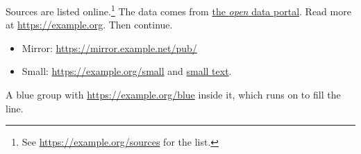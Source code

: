 \documentclass{article}
\begin{document}
Sources are listed online.\footnote{See \url{https://example.org/sources} for the list.} The
data comes from \href{https://data.example.org}{the \emph{open} data portal}. Read more at
\url{https://example.org}. Then continue.

\begin{itemize}
  \item Mirror: \url{https://mirror.example.net/pub/}
  \item {\small Small: \url{https://example.org/small} and \href{https://example.org/x}{small text}.}
\end{itemize}

{\color{blue}A blue group with \url{https://example.org/blue} inside it, which runs on to fill the line.}
\end{document}
